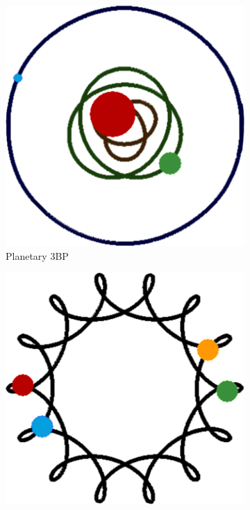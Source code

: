\begin{figure}[!t]
\centering
\begin{subfigure}[m]{0.3\textwidth}
\includegraphics[width=\textwidth]{images/SIM/nbp1.png}
\caption{\small Planetary 3BP}
\end{subfigure}\quad
\begin{subfigure}[m]{0.3\textwidth}
\includegraphics[width=\textwidth]{images/SIM/nbp2.png}

\end{subfigure}
\end{figure}

